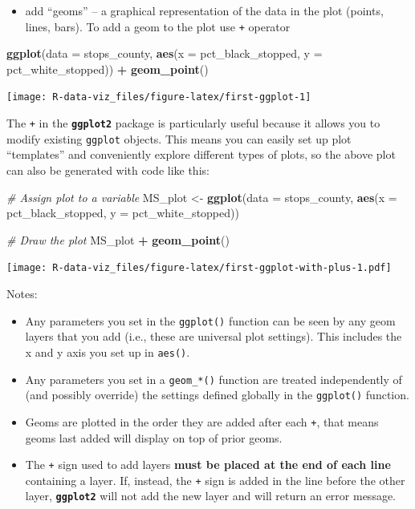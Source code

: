 \documentclass[]{book}
\newenvironment{Shaded}{\begin{snugshade}}{\end{snugshade}}
\newcommand{\KeywordTok}[1]{\textcolor[rgb]{0.13,0.29,0.53}{\textbf{#1}}}
\newcommand{\DataTypeTok}[1]{\textcolor[rgb]{0.13,0.29,0.53}{#1}}
\newcommand{\StringTok}[1]{\textcolor[rgb]{0.31,0.60,0.02}{#1}}
\newcommand{\CommentTok}[1]{\textcolor[rgb]{0.56,0.35,0.01}{\textit{#1}}}
\newcommand{\OperatorTok}[1]{\textcolor[rgb]{0.81,0.36,0.00}{\textbf{#1}}}
\newcommand{\NormalTok}[1]{#1}
\providecommand{\tightlist}{%
  \setlength{\itemsep}{0pt}\setlength{\parskip}{0pt}}
\theoremstyle{definition}
\theoremstyle{definition}
\theoremstyle{definition}
\theoremstyle{remark}
\begin{document}
\begin{itemize}
\tightlist
\item
  add ``geoms'' -- a graphical representation of the data in the plot
  (points, lines, bars). To add a geom to the plot use \texttt{+}
  operator
\end{itemize}

\begin{Shaded}
\begin{Highlighting}[]
\KeywordTok{ggplot}\NormalTok{(}\DataTypeTok{data =}\NormalTok{ stops_county, }\KeywordTok{aes}\NormalTok{(}\DataTypeTok{x =}\NormalTok{ pct_black_stopped, }\DataTypeTok{y =}\NormalTok{ pct_white_stopped)) }\OperatorTok{+}
\StringTok{  }\KeywordTok{geom_point}\NormalTok{()}
\end{Highlighting}
\end{Shaded}

\texttt{[image: R-data-viz\_files/figure-latex/first-ggplot-1]}

The \texttt{+} in the \textbf{\texttt{ggplot2}} package is particularly
useful because it allows you to modify existing \texttt{ggplot} objects.
This means you can easily set up plot ``templates'' and conveniently
explore different types of plots, so the above plot can also be
generated with code like this:

\begin{Shaded}
\begin{Highlighting}[]
\CommentTok{# Assign plot to a variable}
\NormalTok{MS_plot <-}\StringTok{ }\KeywordTok{ggplot}\NormalTok{(}\DataTypeTok{data =}\NormalTok{ stops_county, }\KeywordTok{aes}\NormalTok{(}\DataTypeTok{x =}\NormalTok{ pct_black_stopped, }\DataTypeTok{y =}\NormalTok{ pct_white_stopped))}

\CommentTok{# Draw the plot}
\NormalTok{MS_plot }\OperatorTok{+}\StringTok{ }\KeywordTok{geom_point}\NormalTok{()}
\end{Highlighting}
\end{Shaded}

\texttt{[image: R-data-viz\_files/figure-latex/first-ggplot-with-plus-1.pdf]}

Notes:

\begin{itemize}
\tightlist
\item
  Any parameters you set in the \texttt{ggplot()} function can be seen
  by any geom layers that you add (i.e., these are universal plot
  settings). This includes the x and y axis you set up in
  \texttt{aes()}.
\item
  Any parameters you set in a \texttt{geom\_*()} function are treated
  independently of (and possibly override) the settings defined globally
  in the \texttt{ggplot()} function.
\item
  Geoms are plotted in the order they are added after each \texttt{+},
  that means geoms last added will display on top of prior geoms.
\item
  The \texttt{+} sign used to add layers \textbf{must be placed at the
  end of each line} containing a layer. If, instead, the \texttt{+} sign
  is added in the line before the other layer, \textbf{\texttt{ggplot2}}
  will not add the new layer and will return an error message.
\end{itemize}
\end{document}
